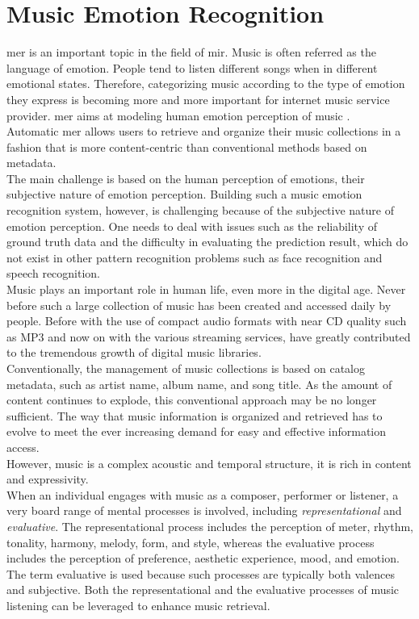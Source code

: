 \newpage
\section{Music Emotion Recognition}
\gls{mer} is an important topic in the field of \gls{mir}. Music is often referred as the language of emotion. People tend to listen different songs when in different emotional states. Therefore, categorizing music according to the type of emotion they express is becoming more and more important for internet music service provider. \gls{mer} aims at modeling human emotion perception of music \cite{yang2011music}.
\\
Automatic \gls{mer} allows users to retrieve and organize their music collections in a fashion that is more content-centric than conventional methods based on metadata.
\\
The main challenge is based on the human perception of emotions, their subjective nature of emotion perception. 
Building such a music emotion recognition system, however, is challenging because of the subjective nature of emotion perception. One needs to deal with issues such as the reliability of ground truth data and the difficulty in evaluating the prediction result, which do not exist in other pattern recognition problems such as face recognition and speech recognition. 
\\ \indent
Music plays an important role in human life, even more in the digital age. Never before such a large collection of music has been created and accessed daily by people. Before with the use of compact audio formats with near CD quality such as MP3 and now on with the various streaming services, have greatly contributed to the tremendous growth of digital music libraries.
\\ \indent
Conventionally, the management of music collections is based on catalog metadata, such as artist name, album name, and song title. As the amount of content continues to explode, this conventional approach may be no longer sufficient. The way that music information is organized and retrieved has to evolve to meet the ever increasing demand for easy and effective information access.
\\ \indent
However, music is a complex acoustic and temporal structure, it is rich in content and expressivity.
\\
When an individual engages with music as a composer, performer or listener, a very board range of mental processes is involved, including \textit{representational} and \textit{evaluative}. The representational process includes the perception of meter, rhythm, tonality, harmony, melody, form, and style, whereas the evaluative process includes the perception of preference, aesthetic experience, mood, and emotion. The term evaluative is used because such processes are typically both valences and subjective. Both the representational and the evaluative processes of music listening can be leveraged to enhance music retrieval.
